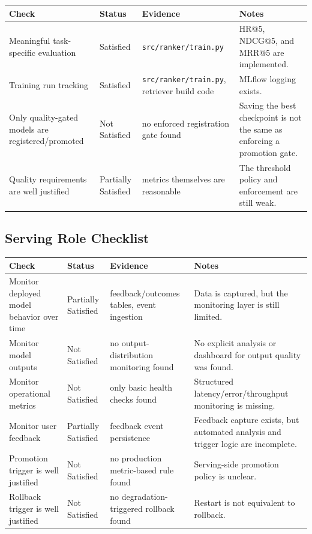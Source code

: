 \documentclass[11pt,a4paper]{article}
\begin{document}
\begin{tabularx}{\textwidth}{P{4.2cm}P{2.4cm}P{3.8cm}Y}
\toprule
\textbf{Check} & \textbf{Status} & \textbf{Evidence} & \textbf{Notes} \\
\midrule
Meaningful task-specific evaluation & Satisfied & \texttt{src/ranker/train.py} & HR@5, NDCG@5, and MRR@5 are implemented. \\
Training run tracking & Satisfied & \texttt{src/ranker/train.py}, retriever build code & MLflow logging exists. \\
Only quality-gated models are registered/promoted & Not Satisfied & no enforced registration gate found & Saving the best checkpoint is not the same as enforcing a promotion gate. \\
Quality requirements are well justified & Partially Satisfied & metrics themselves are reasonable & The threshold policy and enforcement are still weak. \\
\bottomrule
\end{tabularx}

\subsection{Serving Role Checklist}

\begin{tabularx}{\textwidth}{P{4.2cm}P{2.4cm}P{3.8cm}Y}
\toprule
\textbf{Check} & \textbf{Status} & \textbf{Evidence} & \textbf{Notes} \\
\midrule
Monitor deployed model behavior over time & Partially Satisfied & feedback/outcomes tables, event ingestion & Data is captured, but the monitoring layer is still limited. \\
Monitor model outputs & Not Satisfied & no output-distribution monitoring found & No explicit analysis or dashboard for output quality was found. \\
Monitor operational metrics & Not Satisfied & only basic health checks found & Structured latency/error/throughput monitoring is missing. \\
Monitor user feedback & Partially Satisfied & feedback event persistence & Feedback capture exists, but automated analysis and trigger logic are incomplete. \\
Promotion trigger is well justified & Not Satisfied & no production metric-based rule found & Serving-side promotion policy is unclear. \\
Rollback trigger is well justified & Not Satisfied & no degradation-triggered rollback found & Restart is not equivalent to rollback. \\
\bottomrule
\end{tabularx}
\end{document}
